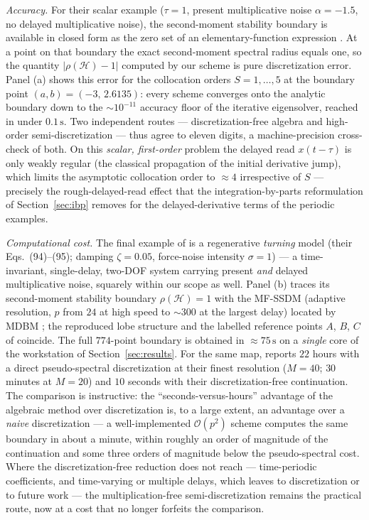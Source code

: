\documentclass[preprint,12pt]{elsarticle}
\begin{document}
\emph{Accuracy.} For their scalar example ($\tau=1$, present multiplicative noise $\alpha=-1.5$, no delayed multiplicative noise), the second-moment stability boundary is available in closed form as the zero set of an elementary-function expression \cite[Eq.~54]{Iklodi2026}. At a point on that boundary the exact second-moment spectral radius equals one, so the quantity $|\rho(\mathcal{H})-1|$ computed by our scheme is pure discretization error. Panel (a) shows this error for the collocation orders $S=1,\dots,5$ at the boundary point $(a,b)=(-3,\,2.6135)$: every scheme converges onto the analytic boundary down to the $\sim\!10^{-11}$ accuracy floor of the iterative eigensolver, reached in under $0.1\,\mathrm{s}$. Two independent routes --- discretization-free algebra and high-order semi-discretization --- thus agree to eleven digits, a machine-precision cross-check of both. On this \emph{scalar, first-order} problem the delayed read $x(t-\tau)$ is only weakly regular (the classical propagation of the initial derivative jump), which limits the asymptotic collocation order to $\approx 4$ irrespective of $S$ --- precisely the rough-delayed-read effect that the integration-by-parts reformulation of Section~\ref{sec:ibp} removes for the delayed-derivative terms of the periodic examples.

\emph{Computational cost.} The final example of \cite{Iklodi2026} is a regenerative \emph{turning} model (their Eqs.~(94)--(95); damping $\zeta=0.05$, force-noise intensity $\sigma=1$) --- a time-invariant, single-delay, two-DOF system carrying present \emph{and} delayed multiplicative noise, squarely within our scope as well. Panel (b) traces its second-moment stability boundary $\rho(\mathcal{H})=1$ with the MF-SSDM (adaptive resolution, $p$ from $24$ at high speed to $\sim\!300$ at the largest delay) located by MDBM \cite{Bachrathy2021}; the reproduced lobe structure and the labelled reference points $A$, $B$, $C$ of \cite[Fig.~13]{Iklodi2026} coincide. The full $774$-point boundary is obtained in $\approx 75\,\mathrm{s}$ on a \emph{single} core of the workstation of Section~\ref{sec:results}. For the same map, \cite{Iklodi2026} reports $22$ hours with a direct pseudo-spectral discretization at their finest resolution ($M=40$; $30$ minutes at $M=20$) and $10$ seconds with their discretization-free continuation. The comparison is instructive: the ``seconds-versus-hours'' advantage of the algebraic method over discretization is, to a large extent, an advantage over a \emph{naive} discretization --- a well-implemented $\mathcal{O}(p^2)$ scheme computes the same boundary in about a minute, within roughly an order of magnitude of the continuation and some three orders of magnitude below the pseudo-spectral cost. Where the discretization-free reduction does not reach --- time-periodic coefficients, and time-varying or multiple delays, which \cite{Iklodi2026} leaves to discretization or to future work --- the multiplication-free semi-discretization remains the practical route, now at a cost that no longer forfeits the comparison.
\end{document}
